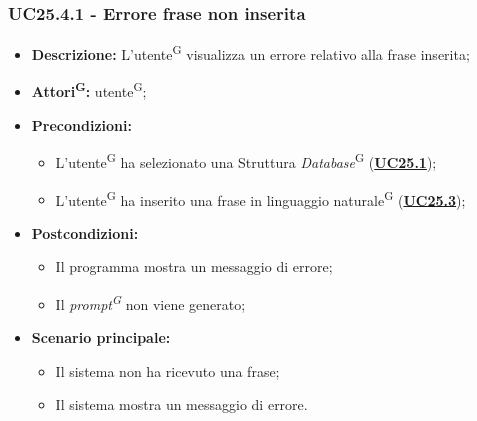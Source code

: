\subsubsection{UC25.4.1 - Errore frase non inserita}
\label{sec:UC25.4.1}
\begin{itemize}
	\item \textbf{Descrizione:} L’utente\textsuperscript{G} visualizza un errore relativo alla frase inserita;
	\item \textbf{Attori\textsuperscript{G}:} utente\textsuperscript{G};
	\item \textbf{Precondizioni:} 
	\begin{itemize}
		\item L’utente\textsuperscript{G} ha selezionato una Struttura \textit{Database}\textsuperscript{G} (\hyperref[sec:UC25.1]{\textbf{UC25.1}});
		\item L'utente\textsuperscript{G} ha inserito una frase in linguaggio naturale\textsuperscript{G} (\hyperref[sec:UC25.3]{\textbf{UC25.3}});
	\end{itemize}
	\item \textbf{Postcondizioni:} 
	\begin{itemize}
		\item Il programma mostra un messaggio di errore;
		\item Il \textit{prompt\textsuperscript{G}} non viene generato;
	\end{itemize}
	\item \textbf{Scenario principale:} 
	\begin{itemize}
		\item Il sistema non ha ricevuto una frase;
		\item Il sistema mostra un messaggio di errore.
	\end{itemize}
\end{itemize}


